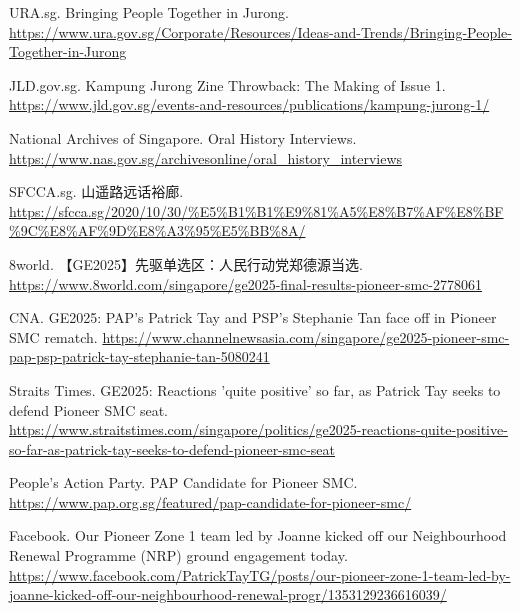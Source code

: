 \documentclass[11pt,a4paper,twoside,openany]{book}
\begin{document}
\begin{enumerate}[label={[\arabic*]},leftmargin=*,topsep=2pt,itemsep=1pt,parsep=0pt]
  \item URA.sg. Bringing People Together in Jurong. \url{https://www.ura.gov.sg/Corporate/Resources/Ideas-and-Trends/Bringing-People-Together-in-Jurong}
  \item JLD.gov.sg. Kampung Jurong Zine Throwback: The Making of Issue 1. \url{https://www.jld.gov.sg/events-and-resources/publications/kampung-jurong-1/}
  \item National Archives of Singapore. Oral History Interviews. \url{https://www.nas.gov.sg/archivesonline/oral_history_interviews}
  \item SFCCA.sg. 山遥路远话裕廊. \url{https://sfcca.sg/2020/10/30/%E5%B1%B1%E9%81%A5%E8%B7%AF%E8%BF%9C%E8%AF%9D%E8%A3%95%E5%BB%8A/}
  \item 8world. 【GE2025】先驱单选区：人民行动党郑德源当选. \url{https://www.8world.com/singapore/ge2025-final-results-pioneer-smc-2778061}
  \item CNA. GE2025: PAP's Patrick Tay and PSP's Stephanie Tan face off in Pioneer SMC rematch. \url{https://www.channelnewsasia.com/singapore/ge2025-pioneer-smc-pap-psp-patrick-tay-stephanie-tan-5080241}
  \item Straits Times. GE2025: Reactions 'quite positive' so far, as Patrick Tay seeks to defend Pioneer SMC seat. \url{https://www.straitstimes.com/singapore/politics/ge2025-reactions-quite-positive-so-far-as-patrick-tay-seeks-to-defend-pioneer-smc-seat}
  \item People's Action Party. PAP Candidate for Pioneer SMC. \url{https://www.pap.org.sg/featured/pap-candidate-for-pioneer-smc/}
  \item Facebook. Our Pioneer Zone 1 team led by Joanne kicked off our Neighbourhood Renewal Programme (NRP) ground engagement today. \url{https://www.facebook.com/PatrickTayTG/posts/our-pioneer-zone-1-team-led-by-joanne-kicked-off-our-neighbourhood-renewal-progr/1353129236616039/}
\end{enumerate}


\backmatter
%
\end{document}
